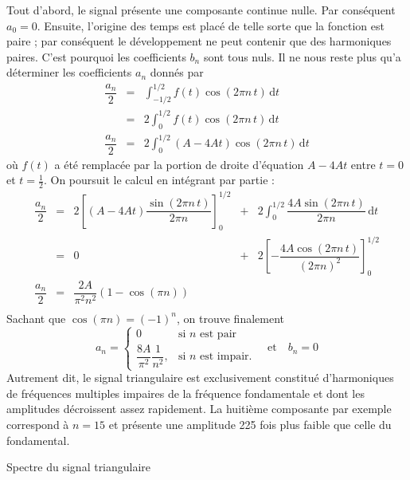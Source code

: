Tout d'abord, le signal présente une composante continue nulle. Par conséquent \(a_0=0\). Ensuite, l'origine des temps est placé de telle sorte que la fonction est paire ; par conséquent le développement ne peut contenir que des harmoniques paires. C'est pourquoi les coefficients \(b_n\) sont tous nuls. Il ne nous reste plus qu'a déterminer les coefficients \(a_n\) donnés par
\[
\begin{array}{rcl}
\dfrac{a_n}{2}	&=& \displaystyle{\int_{-1/2}^{1/2}}f(t)\cos(2\pi n\, t)\,\mathrm{d}t \\[4mm]
				&=& 2\displaystyle{\int_{0}^{1/2}}f(t)\cos(2\pi n\, t)\, \mathrm{d}t \\[4mm]
\dfrac{a_n}{2}	&=& 2\displaystyle{\int_{0}^{1/2}}(A-4At)\cos(2\pi n\, t)\, \mathrm{d}t
\end{array}
\]
où \(f(t)\) a été remplacée par la portion de droite d'équation \(A-4At\) entre \(t=0\) et \(t=\frac12\). On poursuit le calcul en intégrant par partie :
\[
\begin{array}{rcccl}
\dfrac{a_n}{2}	&=&2\left[(A-4At)\dfrac{\sin(2\pi n \,t)}{2\pi n}\right]_0^{1/2}&+&2\displaystyle{\int_{0}^{1/2}}\dfrac{4A\sin(2\pi n \,t)}{2\pi n}\, \mathrm{d}t \\[4mm]
			&=&0&+&	2\left[-\dfrac{4A\cos(2\pi n \,t)}{(2\pi n)^2}\right]_0^{1/2}\\[4mm]
\dfrac{a_n}{2}	&=&\dfrac{2A}{\pi^2n^2}\left(1-\cos(\pi n)\right)&&\\
\end{array}
\]
Sachant que \(\cos(\pi n)=(-1)^n\), on trouve finalement
\begin{equation}
	a_n=
	\begin{cases}
	0					& \text{si } n \text{ est pair} \\[3mm]
	\dfrac{8A}{\pi^2} \dfrac{1}{n^2},	& \text{si } n \text{ est impair.}
	\end{cases}
	\quad\text{et}\quad
	b_n=0
	\label{coef_fourier_triangle}
\end{equation}
Autrement dit, le signal triangulaire est exclusivement constitué d'harmoniques de fréquences multiples impaires de la fréquence fondamentale et dont les amplitudes décroissent assez rapidement. La huitième composante par exemple correspond à \(n=15\) et présente une amplitude 225 fois plus faible que celle du fondamental.
\begin{marginfigure}[*-10]
\centering
{}
\caption{Spectre du signal triangulaire}
\end{marginfigure}

